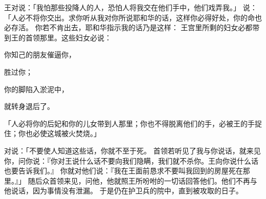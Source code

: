 {王对{}说：「我怕那些投降{}人的{}人，恐怕{}人将我交在他们手中，他们戏弄我。」
说：「{}人必不将你交出。求你听从我对你所说耶和华的话，这样你必得好处，你的命也必存活。
你若不肯出去，耶和华指示我的话乃是这样：
王宫里所剩的妇女必都带到{}王的首领那里。这些妇女必说：
\par }{\Q 你知己的朋友催逼你，
\par }{\Q 胜过你；
\par }{你的脚陷入淤泥中，
\par }{\Q 就转身退后了。
\par }{\PP {}「人必将你的后妃和你的儿女带到{}人那里；你也不得脱离他们的手，必被{}王的手捉住；你也必使这城被火焚烧。」
\par }{\PP {}对{}说：「不要使人知道这些话，你就不至于死。
首领若听见了我与你说话，就来见你，问你说：『你对王说什么话不要向我们隐瞒，我们就不杀你。王向你说什么话也要告诉我们。』
你就对他们说：『我在王面前恳求不要叫我回到{}的房屋死在那里。』」
随后众首领来见{}，问他，他就照王所吩咐的一切话回答他们。他们不再与他说话，因为事情没有泄漏。
于是{}仍在护卫兵的院中，直到{}被攻取的日子。

}
